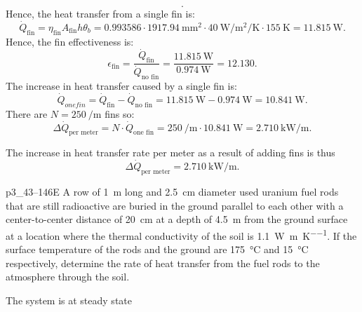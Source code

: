 \begin{derivation}
\begin{equation*}
  .\end{equation*}
  Hence, the heat transfer from a single fin is:
  \begin{equation*}
    \dot{Q}_{\text{fin}} = \eta_{\text{fin}} A_{\text{fin}} h \theta_b = \num{0,993586} \cdot \qty{1917,94}{\mm\squared} \cdot \qty{40}{\W\per\m\squared\per\K} \cdot \qty{155}{\K}  = \qty{11.815}{\watt}
  .\end{equation*}
  Hence, the fin effectiveness is:
  \begin{equation*}
    \epsilon_{\text{fin}} = \frac{\dot{Q}_{\text{fin}}}{\dot{Q}_{\text{no fin}}} = \frac{\qty{11,815}{\W}}{\qty{0,974}{\W}} = \num{12.130}
  .\end{equation*}
  The increase in heat transfer caused by a single fin is:
  \begin{equation*}
    \dot{Q}_{one fin} = \dot{Q}_{\text{fin}} - \dot{Q}_{\text{no fin}} = \qty{11,815}{\W} - \qty{0,974}{\W}  = \qty{10.841}{\watt}
  .\end{equation*}
  There are $N = \qty{250}{\per\m}$ fins so:
  \begin{equation*}
    \Delta \dot{Q}_{\text{per meter}} = N \cdot \dot{Q}_{\text{one fin}} = \qty{250}{\per\m} \cdot \qty{10,841}{\W} = \qty{2,710}{\kW\per\meter} 
  .\end{equation*}
\end{derivation}

\begin{finalresult}
  The increase in heat transfer rate per meter as a result of adding fins is thus
  \begin{equation*}
    \Delta \dot{Q}_{\text{per meter}} = \qty{2,710}{\kW\per\m}
  .\end{equation*}
\end{finalresult}

\begin{problemwithimage}{p3_4}{3--146E}
  A row of \qty{1}{\m} long and \qty{2,5}{\cm} diameter used uranium fuel rods that are still radioactive are buried in the ground parallel to each other with a center-to-center distance of \qty{20}{\cm} at a depth of \qty{4,5}{\m} from the ground surface at a location where the thermal conductivity of the soil is \qty{1,1}{\W\per\m\per\K}.
  If the surface temperature of the rods and the ground are \qty{175}{\celsius} and \qty{15}{\celsius} respectively, determine the rate of heat transfer from the fuel rods to the atmosphere through the soil.
\end{problemwithimage}

\begin{assumptions}
  \item The system is at steady state
\end{assumptions}

